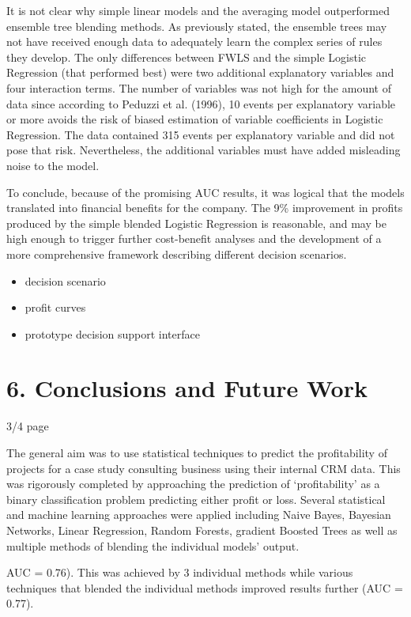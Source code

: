 \documentclass[]{elsarticle} %
\begin{document}
It is not clear why simple linear models and the averaging model
outperformed ensemble tree blending methods. As previously stated, the
ensemble trees may not have received enough data to adequately learn the
complex series of rules they develop. The only differences between FWLS
and the simple Logistic Regression (that performed best) were two
additional explanatory variables and four interaction terms. The number
of variables was not high for the amount of data since according to
Peduzzi et al. (1996), 10 events per explanatory variable or more avoids
the risk of biased estimation of variable coefficients in Logistic
Regression. The data contained 315 events per explanatory variable and
did not pose that risk. Nevertheless, the additional variables must have
added misleading noise to the model.

To conclude, because of the promising AUC results, it was logical that
the models translated into financial benefits for the company. The 9\%
improvement in profits produced by the simple blended Logistic
Regression is reasonable, and may be high enough to trigger further
cost-benefit analyses and the development of a more comprehensive
framework describing different decision scenarios.

\begin{itemize}
\item
  decision scenario
\item
  profit curves
\item
  prototype decision support interface
\end{itemize}

\section{6. Conclusions and Future
Work}\label{conclusions-and-future-work}

3/4 page

The general aim was to use statistical techniques to predict the
profitability of projects for a case study consulting business using
their internal CRM data. This was rigorously completed by approaching
the prediction of `profitability' as a binary classification problem
predicting either profit or loss. Several statistical and machine
learning approaches were applied including Naive Bayes, Bayesian
Networks, Linear Regression, Random Forests, gradient Boosted Trees as
well as multiple methods of blending the individual models' output.

AUC = 0.76). This was achieved by 3 individual methods while various
techniques that blended the individual methods improved results further
(AUC = 0.77).
\end{document}
